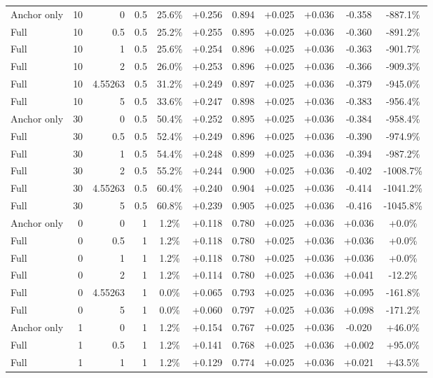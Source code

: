 \begin{table}[htbp]
\begin{tabular}{lrrrccccccc}
Anchor only & 10 & 0 & 0.5 & 25.6\% & +0.256 & 0.894 & +0.025 & +0.036 & -0.358 & -887.1\% \\
Full & 10 & 0.5 & 0.5 & 25.2\% & +0.255 & 0.895 & +0.025 & +0.036 & -0.360 & -891.2\% \\
Full & 10 & 1 & 0.5 & 25.6\% & +0.254 & 0.896 & +0.025 & +0.036 & -0.363 & -901.7\% \\
Full & 10 & 2 & 0.5 & 26.0\% & +0.253 & 0.896 & +0.025 & +0.036 & -0.366 & -909.3\% \\
Full & 10 & 4.55263 & 0.5 & 31.2\% & +0.249 & 0.897 & +0.025 & +0.036 & -0.379 & -945.0\% \\
Full & 10 & 5 & 0.5 & 33.6\% & +0.247 & 0.898 & +0.025 & +0.036 & -0.383 & -956.4\% \\
Anchor only & 30 & 0 & 0.5 & 50.4\% & +0.252 & 0.895 & +0.025 & +0.036 & -0.384 & -958.4\% \\
Full & 30 & 0.5 & 0.5 & 52.4\% & +0.249 & 0.896 & +0.025 & +0.036 & -0.390 & -974.9\% \\
Full & 30 & 1 & 0.5 & 54.4\% & +0.248 & 0.899 & +0.025 & +0.036 & -0.394 & -987.2\% \\
Full & 30 & 2 & 0.5 & 55.2\% & +0.244 & 0.900 & +0.025 & +0.036 & -0.402 & -1008.7\% \\
Full & 30 & 4.55263 & 0.5 & 60.4\% & +0.240 & 0.904 & +0.025 & +0.036 & -0.414 & -1041.2\% \\
Full & 30 & 5 & 0.5 & 60.8\% & +0.239 & 0.905 & +0.025 & +0.036 & -0.416 & -1045.8\% \\
Anchor only & 0 & 0 & 1 & 1.2\% & +0.118 & 0.780 & +0.025 & +0.036 & +0.036 & +0.0\% \\
Full & 0 & 0.5 & 1 & 1.2\% & +0.118 & 0.780 & +0.025 & +0.036 & +0.036 & +0.0\% \\
Full & 0 & 1 & 1 & 1.2\% & +0.118 & 0.780 & +0.025 & +0.036 & +0.036 & +0.0\% \\
Full & 0 & 2 & 1 & 1.2\% & +0.114 & 0.780 & +0.025 & +0.036 & +0.041 & -12.2\% \\
Full & 0 & 4.55263 & 1 & 0.0\% & +0.065 & 0.793 & +0.025 & +0.036 & +0.095 & -161.8\% \\
Full & 0 & 5 & 1 & 0.0\% & +0.060 & 0.797 & +0.025 & +0.036 & +0.098 & -171.2\% \\
Anchor only & 1 & 0 & 1 & 1.2\% & +0.154 & 0.767 & +0.025 & +0.036 & -0.020 & +46.0\% \\
Full & 1 & 0.5 & 1 & 1.2\% & +0.141 & 0.768 & +0.025 & +0.036 & +0.002 & +95.0\% \\
Full & 1 & 1 & 1 & 1.2\% & +0.129 & 0.774 & +0.025 & +0.036 & +0.021 & +43.5\% \\

\end{tabular}
\end{table}
